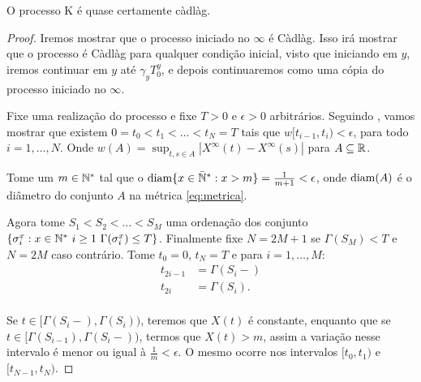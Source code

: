 \begin{proposicao}
  \label{prop:proc-cadlag}
  O processo K é quase certamente càdlàg.
\end{proposicao}
\begin{proof}

  Iremos mostrar que o processo iniciado no $\infty$ é Càdlàg. Isso
  irá mostrar que o processo é Càdlàg para qualquer condição inicial,
  visto que iniciando em $y$, iremos continuar em $y$ até $\gamma_y
  T^y_0$, e depois continuaremos como uma cópia do processo iniciado no
  $\infty$.

  Fixe uma realização do processo e fixe $T > 0$ e $\epsilon > 0$
  arbitrários. Seguindo \cite{billingsley:99}, vamos mostrar que
  existem $0 = t_0 < t_1 < \ldots < t_N = T$ tais que $w[t_{i-1}, t_i)
  < \epsilon$, para todo $i = 1, \ldots, N$. Onde $w(A) = \sup_{t, s
    \in A} |X^\infty(t) - X^\infty(s)|$ para $A \subseteq {\mathbb{R}}$.

  Tome um $m \in {\mathbb{N^*}}$ tal que o ${\mathrm{diam}}\{x \in {\mathbb{\bar{N}^*}}: x > m \} =
  \frac{1}{m+1} < \epsilon$, onde ${\mathrm{diam}}(A)$ é o diâmetro do conjunto
  $A$ na métrica \eqref{eq:metrica}.

  Agora tome $S_1 < S_2 < \ldots < S_M$ uma ordenação dos conjunto $\{
  \sigma^x_i: x \in {\mathbb{N^*}} \,\, i \geq 1 \,\, \Gamma(\sigma^x_i) \leq
  T\}$. Finalmente fixe $N = 2M+1$ se $\Gamma(S_M) < T$ e $N = 2M$
  caso contrário. Tome $t_0 = 0$, $t_N = T$ e para $i=1,\ldots, M$:
  \begin{align*}
    t_{2i-1} &= \Gamma(S_i-)\\
    t_{2i} &= \Gamma(S_i).\\
  \end{align*}

  Se $t \in [\Gamma(S_i-), \Gamma(S_i))$, teremos que
  $X(t)$ é constante, enquanto que se $t \in
  [\Gamma(S_{i-1}), \Gamma(S_{i}-))$, termos que
  $X(t) > m$, assim a variação nesse intervalo é menor ou igual
  à $\frac{1}{m} < \epsilon$. O mesmo ocorre nos intervalos $[t_0,
  t_1)$ e $[t_{N-1}, t_N)$.
\end{proof}

